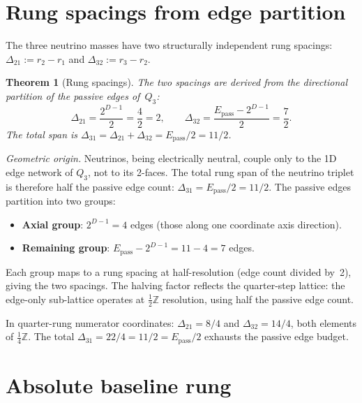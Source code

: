 \documentclass[11pt]{article}
\newtheorem{theorem}{Theorem}
\theoremstyle{remark}
\newcommand{\Epass}{E_{\mathrm{pass}}}
\begin{document}
\section{Rung spacings from edge partition}
\label{sec:spacings}

The three neutrino masses have two structurally independent
rung spacings: $\Delta_{21}:=r_2-r_1$ and
$\Delta_{32}:=r_3-r_2$.

\begin{theorem}[Rung spacings]
\label{thm:spacings}
The two spacings are derived from the directional partition of
the passive edges of~$Q_3$:
\begin{equation}\label{eq:spacings}
  \Delta_{21} = \frac{2^{D-1}}{2} = \frac{4}{2} = 2,
  \qquad
  \Delta_{32} = \frac{\Epass - 2^{D-1}}{2} = \frac{7}{2}.
\end{equation}
The total span is
$\Delta_{31} = \Delta_{21}+\Delta_{32} = \Epass/2 = 11/2$.
\end{theorem}

\noindent\textit{Geometric origin.}\quad
Neutrinos, being electrically neutral, couple only to the 1D
edge network of $Q_3$, not to its 2-faces.  The total rung
span of the neutrino triplet is therefore half the passive edge
count: $\Delta_{31}=\Epass/2=11/2$.  The passive edges partition
into two groups:
\begin{itemize}[nosep]
  \item \textbf{Axial group}: $2^{D-1}=4$ edges (those along
    one coordinate axis direction).
  \item \textbf{Remaining group}: $\Epass-2^{D-1}=11-4=7$ edges.
\end{itemize}
Each group maps to a rung spacing at half-resolution (edge count
divided by~2), giving the two spacings.  The halving factor
reflects the quarter-step lattice: the edge-only sub-lattice
operates at $\frac{1}{2}\mathbb{Z}$ resolution, using half the
passive edge count.

In quarter-rung numerator coordinates:
$\Delta_{21}=8/4$ and $\Delta_{32}=14/4$, both elements of
$\frac{1}{4}\mathbb{Z}$.  The total
$\Delta_{31}=22/4=11/2=\Epass/2$ exhausts the passive edge
budget.

\section{Absolute baseline rung}
\label{sec:baseline}
\end{document}

